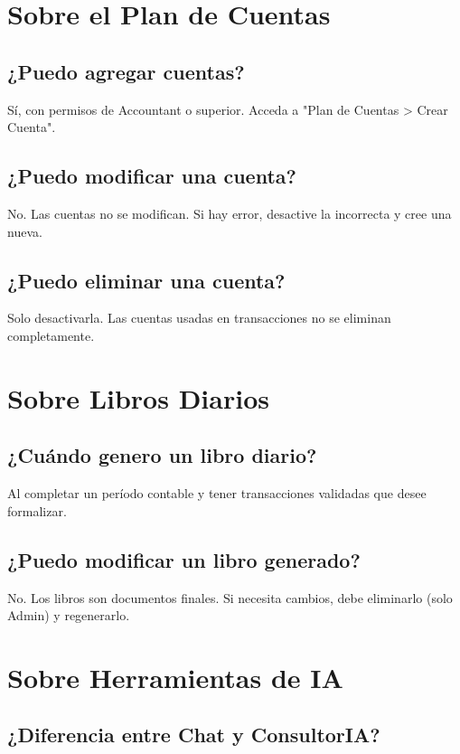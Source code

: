 \section{Sobre el Plan de Cuentas}

\subsection{¿Puedo agregar cuentas?}

Sí, con permisos de Accountant o superior. Acceda a "Plan de Cuentas > Crear Cuenta".

\subsection{¿Puedo modificar una cuenta?}

No. Las cuentas no se modifican. Si hay error, desactive la incorrecta y cree una nueva.

\subsection{¿Puedo eliminar una cuenta?}

Solo desactivarla. Las cuentas usadas en transacciones no se eliminan completamente.

\section{Sobre Libros Diarios}

\subsection{¿Cuándo genero un libro diario?}

Al completar un período contable y tener transacciones validadas que desee formalizar.

\subsection{¿Puedo modificar un libro generado?}

No. Los libros son documentos finales. Si necesita cambios, debe eliminarlo (solo Admin) y regenerarlo.

\section{Sobre Herramientas de IA}

\subsection{¿Diferencia entre Chat y ConsultorIA?}

